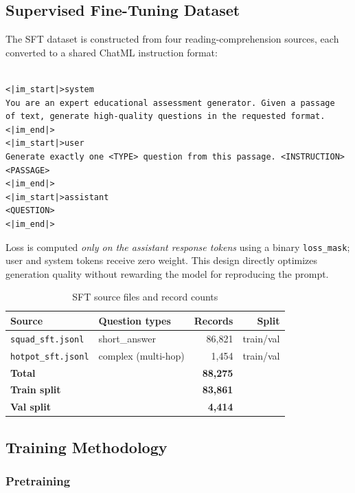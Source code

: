 \documentclass[12pt]{article}
\begin{document}
\subsection{Supervised Fine-Tuning Dataset}

The SFT dataset is constructed from four reading-comprehension sources, each converted to a shared ChatML instruction format:
\\
\\

\begin{lstlisting}
<|im_start|>system
You are an expert educational assessment generator. Given a passage
of text, generate high-quality questions in the requested format.
<|im_end|>
<|im_start|>user
Generate exactly one <TYPE> question from this passage. <INSTRUCTION>
<PASSAGE>
<|im_end|>
<|im_start|>assistant
<QUESTION>
<|im_end|>
\end{lstlisting}

\noindent Loss is computed \emph{only on the assistant response tokens} using a binary \texttt{loss\_mask}; user and system tokens receive zero weight. This design directly optimizes generation quality without rewarding the model for reproducing the prompt.

\begin{table}[H]
  \centering
  \caption{SFT source files and record counts}
  \begin{tabular}{L{3.5cm} L{5.0cm} r r}
    \toprule
    \textbf{Source} & \textbf{Question types} & \textbf{Records} & \textbf{Split} \\
    \midrule
    \texttt{squad\_sft.jsonl} & short\_answer & 86,821 & train/val \\
    \texttt{hotpot\_sft.jsonl} & complex (multi-hop) & 1,454 & train/val \\
    \midrule
    \textbf{Total} & & \textbf{88,275} & \\
    \textbf{Train split} & & \textbf{83,861} & \\
    \textbf{Val split} & & \textbf{4,414} & \\
    \bottomrule
  \end{tabular}
  \label{tab:sft_data}
\end{table}

\subsection{Training Methodology}

\subsubsection{Pretraining}
\end{document}
